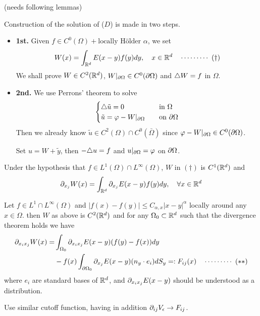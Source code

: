\documentclass[10pt,a4paper]{article}
\newenvironment{proof}
{\begin{changemargin}{0.5cm}{0.5cm} 
	}%
	{\end{changemargin}
}
\renewenvironment{i}
{\begin{itemize} 
	}%
	{\end{itemize}
}
\begin{document}
(needs following lemmas)
\s

Construction of the solution of ($D$) is made in two steps.
\begin{i}
\item[\textbf{1st.}] Given $f\in C^0(\Omega) + \text{locally H\"older } \alpha$, we set
\begin{align*}
W(x) = \int_{\mathbb{R}^d} E(x-y) f(y) dy, \quad x\in \mathbb{R}^d \quad \cdots\cdots\cdots\,\,(\dagger)
\end{align*}
We shall prove $W\in C^2(\mathbb{R}^d)$, $W|_{\partial \Omega} \in C^0(\partial \Omega)$ and $\triangle W=f$ in $\Omega$.

\item[\textbf{2nd.}] We use Perrons' theorem to solve
\begin{align*}
\begin{cases}
\triangle \tilde u =0\quad &\text{in } \Omega\\
\tilde u = \varphi - W|_{\partial \Omega}\quad &\text{on } \partial \Omega
\end{cases}
\end{align*}
Then we already know $\tilde u\in C^2(\Omega) \cap C^0(\bar{\Omega})$ since $\varphi - W|_{\partial \Omega} \in C^0(\partial \Omega)$.

\quad Set $u = W+ \tilde{y}$, then $-\triangle u =f$ and $u|_{\partial \Omega} = \varphi$ on $\partial \Omega$.
\end{i}
\s

 Under the hypothesis that $f\in L^1(\Omega) \cap L^{\infty}(\Omega)$, $W$ in $(\dagger)$ is $C^1(\mathbb{R}^d)$ and
\begin{align*}
\partial_{x_j} W(x) = \int_{\mathbb{R}^d} \partial_{x_j} E(x-y) f(y) dy, \quad \forall x\in \mathbb{R}^d
\end{align*}
\s

 Let $f\in L^1 \cap L^{\infty}(\Omega)$ and $|f(x)-f(y)|\leq C_{\alpha,x} |x-y|^{\alpha}$ locally around any $x\in \Omega$. then $W$ as above is $C^2(\mathbb{R}^d)$ and for any $\Omega_0 \subset \mathbb{R}^d$ such that the divergence theorem holds we have
\begin{align*}
\partial_{x_i x_j} W(x) = &\int_{\Omega_0} \partial_{x_i x_j} E(x-y) (f(y)- f(x))  dy \\
&- f(x)\int_{\partial \Omega_0} \partial_{x_j} E(x-y) (n_y \cdot e_i) dS_y =: F_{ij}(x) \quad \cdots\cdots\cdots\,\,(**)
\end{align*}
where $e_i$ are standard bases of $\mathbb{R}^d$, and $\partial_{x_i x_j} E(x-y)$ should be understood as a distribution.
\begin{proof}
\pf Use similar cutoff function, having in addition $\partial_{ij} V_{\epsilon} \rightarrow F_{ij}$. 
\end{proof}
\s
\end{document}
